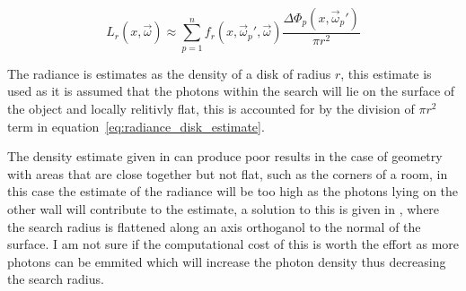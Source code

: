 \begin{equation}
\label{eq:radiance_disk_estimate}
L_{r}(x, \vec{\omega})
\approx
\sum_{p=1}^n
f_{r}(x,\vec{\omega}_{p}', \vec{\omega})
\frac
{
	\Delta\Phi_{p}(x, \vec{\omega}_{p}')
}
{
\pi r^{2}
}
\end{equation}

The radiance is estimates as the density of a disk of radius $r$, this estimate is used as it is
assumed that the photons within the search will lie on the surface of the object and locally 
relitivly flat, this is accounted for by the division of $\pi r^2$ term in equation~\ref{eq:radiance_disk_estimate}.

The density estimate given in \cite{Jensen96a} can produce poor results in the case of geometry with
areas that are close together but not flat, such as the corners of a room, in this case the
estimate of the radiance will be too high as the photons lying on the other wall will contribute to
the estimate, a solution to this is given in \cite{JensenBook}, where the search radius is flattened along
an axis orthoganol to the normal of the surface. I am not sure if the computational cost of this
is worth the effort as more photons can be emmited which will increase the photon density thus
decreasing the search radius.
